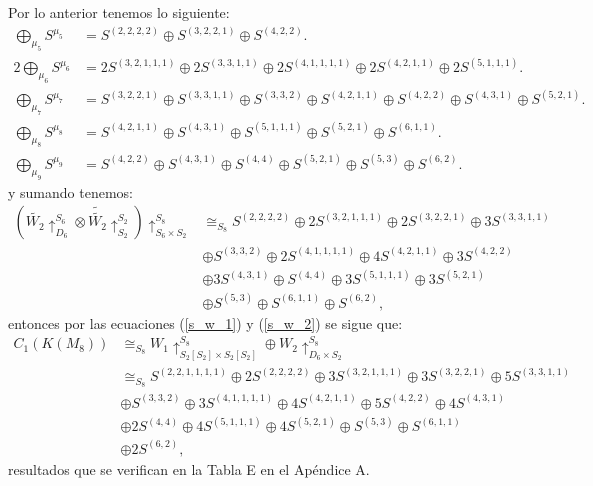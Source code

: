\documentclass[12pt]{book}
\theoremstyle{definition}
\newcounter{in}
\begin{document}
Por lo anterior tenemos lo siguiente:
\begin{equation}
\begin{aligned}
\bigoplus_{\mu_{5}} S^{\mu_{5}} & = S^{(2, 2, 2, 2)} \oplus S^{(3, 2, 2, 1)} \oplus S^{(4, 2, 2)}. \\
2 \bigoplus_{\mu_{6}} S^{\mu_{6}} & = 2S^{(3, 2, 1, 1, 1)} \oplus 2S^{(3, 3, 1, 1)} \oplus 2S^{(4, 1, 1, 1, 1)} \oplus 2S^{(4, 2, 1, 1)} \oplus 2S^{(5, 1, 1, 1)}. \\
\bigoplus_{\mu_{7}} S^{\mu_{7}} & = S^{(3, 2, 2, 1)} \oplus S^{(3, 3, 1, 1)} \oplus S^{(3, 3, 2)} \oplus S^{(4, 2, 1, 1)} \oplus S^{(4, 2, 2)} \oplus S^{(4, 3, 1)} \oplus S^{(5, 2, 1)}. \\
\bigoplus_{\mu_{8}} S^{\mu_{8}} & = S^{(4, 2, 1, 1)} \oplus S^{(4, 3, 1)} \oplus S^{(5, 1, 1, 1)} \oplus S^{(5, 2, 1)} \oplus S^{(6, 1, 1)}. \\
\bigoplus_{\mu_{9}} S^{\mu_{9}} & = S^{(4, 2, 2)} \oplus S^{(4, 3, 1)} \oplus S^{(4, 4)} \oplus S^{(5, 2, 1)} \oplus S^{(5, 3)} \oplus S^{(6, 2)}.
\end{aligned}
\end{equation}
y sumando tenemos:
\begin{equation}
\label{s_w_2}
\begin{aligned}
(\tilde{W_{2}} \uparrow_{D_{6}}^{S_{6}} \otimes \tilde{\tilde{W_{2}}} \uparrow_{S_{2}}^{S_{2}}) \uparrow_{S_{6}\times S_{2}}^{S_{8}} & \cong_{S_{8}} S^{(2, 2, 2, 2)} \oplus 2S^{(3, 2, 1, 1, 1)} \oplus 2S^{(3, 2, 2, 1)} \oplus 3S^{(3, 3, 1, 1)}\\
& \oplus S^{(3, 3, 2)} \oplus 2S^{(4, 1, 1, 1, 1)} \oplus 4S^{(4, 2, 1, 1)} \oplus 3S^{(4, 2, 2)}\\
& \oplus 3S^{(4, 3, 1)} \oplus S^{(4, 4)} \oplus 3S^{(5, 1, 1, 1)} \oplus 3S^{(5, 2, 1)} \\
&\oplus S^{(5, 3)} \oplus S^{(6, 1, 1)} \oplus S^{(6, 2)},
\end{aligned}
\end{equation}
entonces por las ecuaciones (\ref{s_w_1}) y (\ref{s_w_2}) se sigue que:
\begin{equation}
\begin{aligned}
C_{1}(K(M_{8})) & \cong_{S_{8}} W_{1} \uparrow_{S_{2} \left [ S_{2} \right ] \times S_{2} \left [ S_{2} \right ]}^{S_{8}} \oplus W_{2} \uparrow_{D_{6} \times S_{2}}^{S_{8}}\\
& \cong_{S_{8}} S^{(2, 2, 1, 1, 1, 1)} \oplus 2S^{(2, 2, 2, 2)} \oplus 3S^{(3, 2, 1, 1, 1)} \oplus 3S^{(3, 2, 2, 1)} \oplus 5S^{(3, 3, 1, 1)} \\
& \oplus S^{(3, 3, 2)} \oplus 3S^{(4, 1, 1, 1, 1)} \oplus 4S^{(4, 2, 1, 1)} \oplus 5S^{(4, 2, 2)} \oplus 4S^{(4, 3, 1)} \\
& \oplus 2S^{(4, 4)} \oplus 4S^{(5, 1, 1, 1)} \oplus 4S^{(5, 2, 1)} \oplus S^{(5, 3)} \oplus S^{(6, 1, 1)}\\
& \oplus 2S^{(6, 2)},
\end{aligned}
\end{equation}
resultados que se verifican en la Tabla E en el Apéndice A. 
\end{document}
